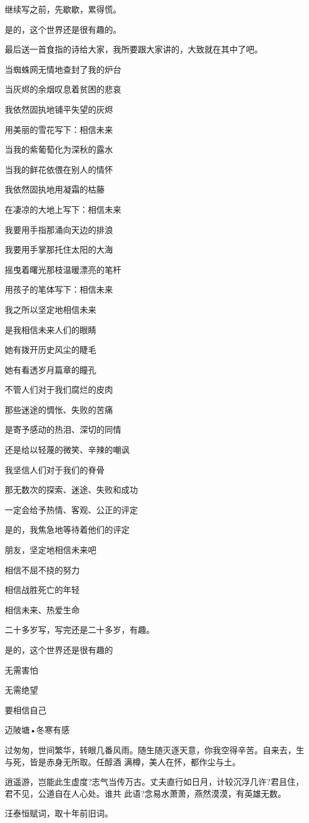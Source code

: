 \documentclass[11pt,a4paper,onecolumn]{article}
\begin{document}
继续写之前，先歇歇，累得慌。

是的，这个世界还是很有趣的。

最后送一首食指的诗给大家，我所要跟大家讲的，大致就在其中了吧。

当蜘蛛网无情地查封了我的炉台

当灰烬的余烟叹息着贫困的悲哀

我依然固执地铺平失望的灰烬

用美丽的雪花写下：相信未来



当我的紫葡萄化为深秋的露水

当我的鲜花依偎在别人的情怀

我依然固执地用凝霜的枯藤

在凄凉的大地上写下：相信未来



我要用手指那涌向天边的排浪

我要用手掌那托住太阳的大海

摇曳着曙光那枝温暖漂亮的笔杆

用孩子的笔体写下：相信未来



我之所以坚定地相信未来

是我相信未来人们的眼睛

她有拨开历史风尘的睫毛

她有看透岁月篇章的瞳孔



不管人们对于我们腐烂的皮肉

那些迷途的惆怅、失败的苦痛

是寄予感动的热泪、深切的同情

还是给以轻蔑的微笑、辛辣的嘲讽



我坚信人们对于我们的脊骨

那无数次的探索、迷途、失败和成功

一定会给予热情、客观、公正的评定

是的，我焦急地等待着他们的评定



朋友，坚定地相信未来吧

相信不屈不挠的努力

相信战胜死亡的年轻

相信未来、热爱生命



二十多岁写，写完还是二十多岁，有趣。

是的，这个世界还是很有趣的

无需害怕

无需绝望

要相信自己



迈陂塘•冬寒有感

过匆匆，世间繁华，转眼几番风雨。随生随灭逐天意，你我空得辛苦。自来去，生与死，皆是赤身无所取。任醇酒
满樽，美人在怀，都作尘与土。

逍遥游，岂能此生虚度?志气当传万古。丈夫直行如日月，计较沉浮几许?君且住，君不见，公道自在人心处。谁共
此语?念易水萧萧，燕然漠漠，有英雄无数。

汪泰恒赋词，取十年前旧词。
\end{document}
